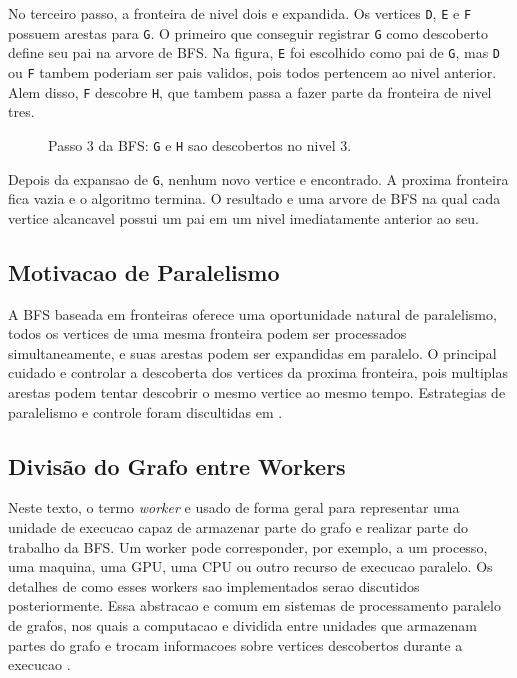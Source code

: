 No terceiro passo, a fronteira de nivel dois e expandida. Os vertices
\texttt{D}, \texttt{E} e \texttt{F} possuem arestas para \texttt{G}. O primeiro
que conseguir registrar \texttt{G} como descoberto define seu pai na arvore de
BFS. Na figura, \texttt{E} foi escolhido como pai de \texttt{G}, mas
\texttt{D} ou \texttt{F} tambem poderiam ser pais validos, pois todos pertencem
ao nivel anterior. Alem disso, \texttt{F} descobre \texttt{H}, que tambem passa
a fazer parte da fronteira de nivel tres.

\begin{figure}[H]
\centering
{}
\caption{Passo 3 da BFS: \texttt{G} e \texttt{H} sao descobertos no nivel 3.}
\label{fig:bfs-step3}
\end{figure}

Depois da expansao de \texttt{G}, nenhum novo vertice e encontrado. A proxima
fronteira fica vazia e o algoritmo termina. O resultado e uma arvore de BFS na
qual cada vertice alcancavel possui um pai em um nivel imediatamente anterior ao
seu.

\subsection{Motivacao de Paralelismo}
A BFS baseada em fronteiras oferece uma oportunidade natural de paralelismo, todos
os vertices de uma mesma fronteira podem ser processados simultaneamente, e suas
arestas podem ser expandidas em paralelo. O principal cuidado e controlar a
descoberta dos vertices da proxima fronteira, pois multiplas arestas podem tentar
descobrir o mesmo vertice ao mesmo tempo. Estrategias de paralelismo e controle foram
discultidas em \cite{merrillgpu}. 

\subsection{Divisão do Grafo entre Workers}
Neste texto, o termo \textit{worker} e usado de forma geral para representar uma
unidade de execucao capaz de armazenar parte do grafo e realizar parte do trabalho
da BFS. Um worker pode corresponder, por exemplo, a um processo, uma maquina, uma
GPU, uma CPU ou outro recurso de execucao paralelo. Os detalhes de como esses
workers sao implementados serao discutidos posteriormente. Essa abstracao e
comum em sistemas de processamento paralelo de grafos, nos quais a computacao e
dividida entre unidades que armazenam partes do grafo e trocam informacoes sobre
vertices descobertos durante a execucao \cite{merrillgpu}.

